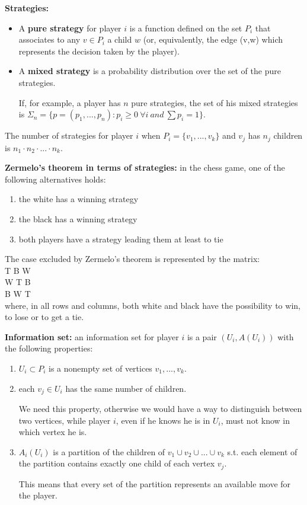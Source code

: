 \bigskip
\noindent \textbf{Strategies:}
\begin{itemize}
	\item A \textbf{pure strategy} for player $i$ is a function defined on the 
	set $P_i$ that associates to any $v \in P_i$ a child $w$ (or, equivalently, 
	the edge (v,w) which represents the decision taken by the player).
	\item A \textbf{mixed strategy} is a probability distribution over the set 
	of the pure strategies.

	\noindent If, for example, a player has $n$ pure strategies, the set of his 
	mixed strategies is $\Sigma_n = \{p = (p_1,...,p_n): p_i \geq 0 
	~\forall i ~and~ \sum{p_i} = 1\}$.
\end{itemize}
The number of strategies for player $i$ when $P_i = \{v_1,...,v_k\}$ and $v_j$ 
has $n_j$ children is $n_1 \cdot n_2 \cdot ... \cdot n_k$.

\bigskip
\noindent \textbf{Zermelo's theorem in terms of strategies:} in the chess game, 
one of the following alternatives holds:
\begin{enumerate}
	\item the white has a winning strategy
	\item the black has a winning strategy
	\item both players have a strategy leading them at least to tie
\end{enumerate}
The case excluded by Zermelo's theorem is represented by the matrix:\\
T \hspace{.6cm} B \hspace{.6cm}	W\\
W \hspace{.6cm} T \hspace{.6cm} B\\
B \hspace{.6cm}	W \hspace{.6cm}	T\\
where, in all rows and columns, both white and black have the possibility to 
win, to lose or to get a tie.

\bigskip
\noindent \textbf{Information set:} an information set for player $i$ is a pair 
$(U_i,A(U_i))$ with the following properties:
\begin{enumerate}
	\item $U_i \subset P_i$ is a nonempty set of vertices $v_1,...,v_k$.
	\item each $v_j \in U_i$ has the same number of children.

	\noindent We need this property, otherwise we would have a way to 
	distinguish between two vertices, while player $i$, even if he knows he is 
	in $U_i$, must not know in which vertex he is.

	\item $A_i(U_i)$ is a partition of the children of $v_1 \cup v_2 \cup ... 
	\cup v_k$ s.t. each element of the partition contains exactly one child of 
	each vertex $v_j$.

	\noindent This means that every set of the partition represents an available 
	move for the player.
\end{enumerate}


